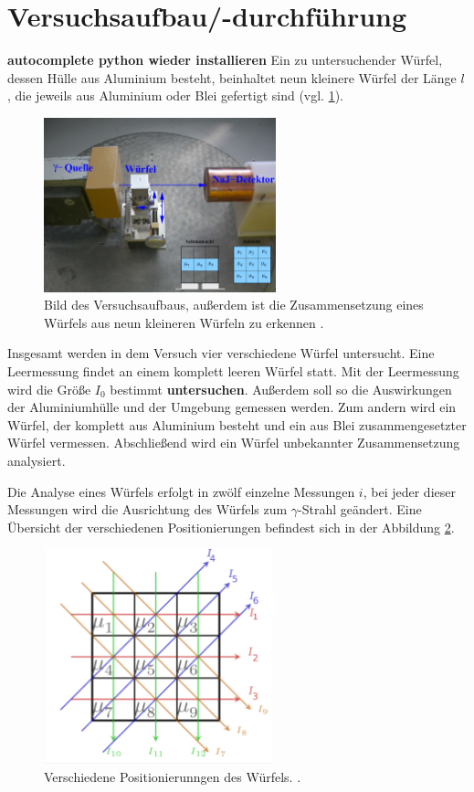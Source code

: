 \section{Versuchsaufbau/-durchführung}
\textbf{autocomplete python wieder installieren}
Ein zu untersuchender Würfel, dessen Hülle aus Aluminium besteht, beinhaltet neun kleinere Würfel der Länge $l$,
die jeweils aus Aluminium oder Blei gefertigt sind (vgl. \ref{fig: aufbau}).

\begin{figure}[h]
  \centering
  \includegraphics[width=0.6\textwidth]{pics/Aufbau.pdf}
  \caption{Bild des Versuchsaufbaus, außerdem ist die Zusammensetzung eines Würfels aus neun kleineren Würfeln zu erkennen \cite{anleitungb14}.}
  \label{fig: aufbau}
\end{figure}

Insgesamt werden in dem Versuch vier verschiedene Würfel untersucht. Eine Leermessung findet an
einem komplett leeren Würfel statt. Mit der Leermessung wird die Größe $I_0$ bestimmt \textbf{untersuchen}.
Außerdem soll so die Auswirkungen der Aluminiumhülle und der Umgebung gemessen werden.
Zum andern wird ein Würfel, der komplett aus Aluminium besteht und
ein aus Blei zusammengesetzter Würfel vermessen. Abschließend wird ein Würfel
unbekannter Zusammensetzung analysiert.

Die Analyse eines Würfels erfolgt in zwölf einzelne Messungen $i$,
bei jeder dieser Messungen wird die Ausrichtung des Würfels zum $\gamma$-Strahl geändert.
Eine Übersicht der verschiedenen Positionierungen befindest sich in der Abbildung \ref{fig: positionierung}.

\begin{figure}[h]
  \centering
  \includegraphics[width=0.6\textwidth]{pics/positionierung.pdf}
  \caption{Verschiedene Positionierunngen des Würfels. \cite{luckyjosh}.}
  \label{fig: positionierung}
\end{figure}

